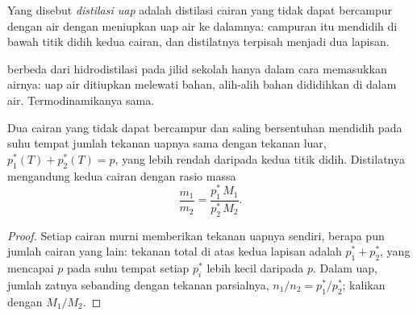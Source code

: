 \begin{definition}\label{def:b2:liquid-vapour-diagrams:steam-distillation}
Yang disebut \emph{distilasi uap} adalah distilasi
cairan yang tidak dapat bercampur dengan air dengan meniupkan uap air ke
dalamnya: campuran itu mendidih di bawah titik didih kedua cairan, dan
distilatnya terpisah menjadi dua lapisan.
\end{definition}

 berbeda dari hidrodistilasi pada jilid sekolah hanya dalam
cara memasukkan airnya: uap air ditiupkan melewati bahan, alih-alih bahan
dididihkan di dalam air. Termodinamikanya sama.

\begin{proposition}\label{prop:b2:liquid-vapour-diagrams:steam}
Dua cairan yang tidak dapat bercampur dan saling bersentuhan mendidih pada
suhu tempat jumlah tekanan uapnya sama dengan tekanan luar,
$p_1^*(T) + p_2^*(T) =
p$, yang lebih rendah daripada kedua titik didih.
Distilatnya mengandung kedua cairan dengan rasio massa
\[
  \frac{m_1}{m_2} = \frac{p_1^*\,M_1}{p_2^*\,M_2} .
\]
\end{proposition}

\begin{proof}
Setiap cairan murni memberikan tekanan uapnya sendiri, berapa pun jumlah
cairan yang lain: tekanan total di atas kedua lapisan adalah
$p_1^* + p_2^*$, yang mencapai $p$ pada suhu tempat setiap $p_i^*$ lebih
kecil daripada $p$. Dalam uap, jumlah zatnya sebanding dengan tekanan
parsialnya, $n_1/n_2 =
p_1^*/p_2^*$; kalikan dengan $M_1/M_2$.
\end{proof}


